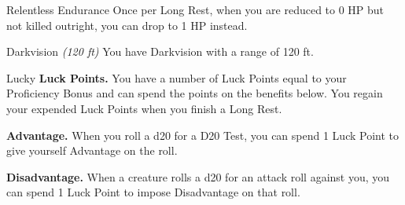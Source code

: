 \begin{Card}{Relentless Endurance}
Once per Long Rest, when you are reduced to 0 HP but not killed outright, you can drop to 1 HP instead.
\end{Card}


\begin{Card}{Darkvision \textit{(120 ft)}}
You have Darkvision with a range of 120 ft.
\end{Card}


\begin{Card}{Lucky}
\textbf{Luck Points.} You have a number of Luck Points equal to your Proficiency Bonus and can spend the points on the benefits below. You regain your expended Luck Points when you finish a Long Rest.

\textbf{Advantage.} When you roll a d20 for a D20 Test, you can spend 1 Luck Point to give yourself Advantage on the roll.

\textbf{Disadvantage.} When a creature rolls a d20 for an attack roll against you, you can spend 1 Luck Point to impose Disadvantage on that roll.
\end{Card}




